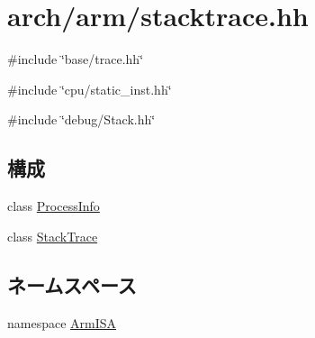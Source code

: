 \hypertarget{arm_2stacktrace_8hh}{
\section{arch/arm/stacktrace.hh}
\label{arm_2stacktrace_8hh}
}
{\ttfamily \#include \char`\"{}base/trace.hh\char`\"{}}\par
{\ttfamily \#include \char`\"{}cpu/static\_\-inst.hh\char`\"{}}\par
{\ttfamily \#include \char`\"{}debug/Stack.hh\char`\"{}}\par
\subsection*{構成}
\begin{DoxyCompactItemize}
\item 
class \hyperlink{classArmISA_1_1ProcessInfo}{ProcessInfo}
\item 
class \hyperlink{classArmISA_1_1StackTrace}{StackTrace}
\end{DoxyCompactItemize}
\subsection*{ネームスペース}
\begin{DoxyCompactItemize}
\item 
namespace \hyperlink{namespaceArmISA}{ArmISA}
\end{DoxyCompactItemize}
